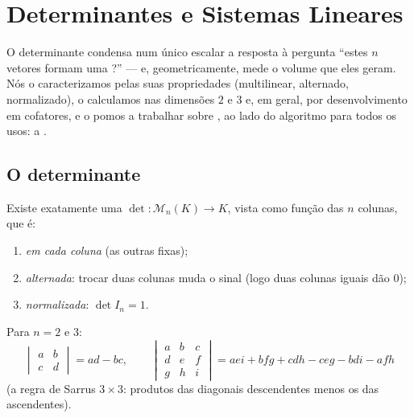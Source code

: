 \chapter{Determinantes e Sistemas Lineares}\label{ch:b1:det}

O determinante condensa num único escalar a resposta à pergunta
``estes $n$ vetores formam uma ?'' --- e, geometricamente, mede o
volume que eles geram. Nós o caracterizamos pelas suas propriedades
(multilinear, alternado, normalizado), o calculamos nas dimensões $2$
e $3$ e, em geral, por desenvolvimento em cofatores, e o pomos a
trabalhar sobre , ao lado do algoritmo para todos os
usos: a .

\section{O determinante}

\begin{theorem}[Caracterização]\label{thm:b1:det:def}
Existe exatamente uma  $\det \colon \mathcal{M}_n(K) \to K$, vista como função das $n$
colunas, que é:
\begin{enumerate}
  \item \emph{ em cada coluna} (as outras fixas);
  \item \emph{alternada}: trocar duas colunas muda o sinal (logo
        duas colunas iguais dão $0$);
  \item \emph{normalizada}: $\det I_n = 1$.
\end{enumerate}
Para $n = 2$ e $3$:
\[
\begin{vmatrix} a & b\\ c & d\end{vmatrix} = ad - bc,
\qquad
\begin{vmatrix} a & b & c\\ d & e & f\\ g & h & i\end{vmatrix}
= aei + bfg + cdh - ceg - bdi - afh
\]
(a regra de Sarrus $3 \times 3$: produtos das diagonais descendentes menos
os das ascendentes).
\end{theorem}
\admitted

